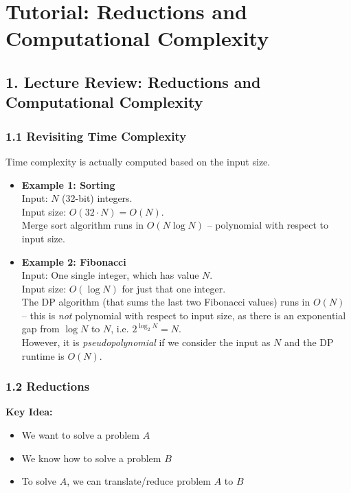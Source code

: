 \documentclass[9pt]{extarticle}
\begin{document}
\section*{Tutorial: Reductions and Computational Complexity}

\subsection*{1. Lecture Review: Reductions and Computational Complexity}

\subsubsection*{1.1 Revisiting Time Complexity}

Time complexity is actually computed based on the input size.

\begin{itemize}
    \item \textbf{Example 1: Sorting}\\
    Input: \( N \) (32-bit) integers.\\
    Input size: \( O(32 \cdot N) = O(N) \).\\
    Merge sort algorithm runs in \( O(N \log N) \) – polynomial with respect to input size.
    
    \item \textbf{Example 2: Fibonacci}\\
    Input: One single integer, which has value \( N \).\\
    Input size: \( O(\log N) \) for just that one integer.\\
    The DP algorithm (that sums the last two Fibonacci values) runs in \( O(N) \) – this is \emph{not} polynomial with respect to input size, as there is an exponential gap from \(\log N\) to \(N\), i.e. \( 2^{\log_2 N} = N \).\\
    However, it is \emph{pseudopolynomial} if we consider the input as \( N \) and the DP runtime is \( O(N) \).
\end{itemize}

\subsubsection*{1.2 Reductions}

\textbf{Key Idea:}
\begin{itemize}
    \item We want to solve a problem \( A \)
    \item We know how to solve a problem \( B \)
    \item To solve \( A \), we can translate/reduce problem \( A \) to \( B \)
\end{itemize}
\end{document}

